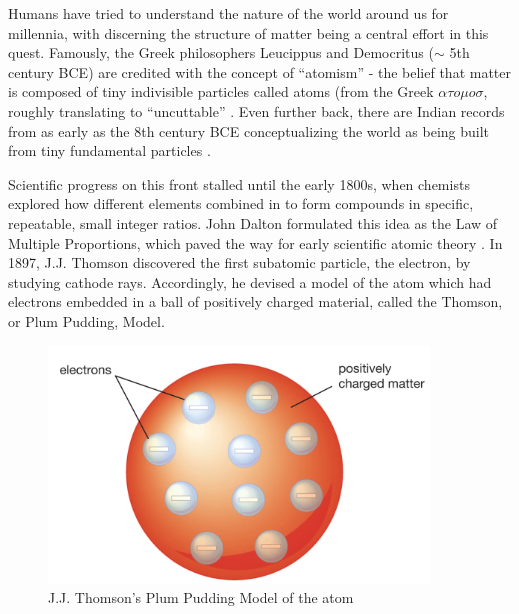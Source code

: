 Humans have tried to understand the nature of the world around us for millennia, with discerning the structure of matter being a central effort in this quest. Famously, the Greek philosophers Leucippus and Democritus ($\sim$ 5th century BCE) are credited with the concept of ``atomism'' - the belief that matter is composed of tiny indivisible particles called atoms (from the Greek $\alpha \tau o \mu o \sigma$, roughly translating to ``uncuttable'' \parencite{C.C.W.Taylor1999Commentary}. Even further back, there are Indian records from as early as the 8th century BCE conceptualizing the world as being built from tiny fundamental particles \parencite{ThomasMcEvilley2002THePhilosophies}.

Scientific progress on this front stalled until the early 1800s, when chemists explored how different elements combined in to form compounds in specific, repeatable, small integer ratios. John Dalton formulated this idea as the Law of Multiple Proportions, which paved the way for early scientific atomic theory \parencite{Britannica2010LawProportions}. In 1897, J.J. Thomson discovered the first subatomic particle, the electron, by studying cathode rays\parencite{Thomson1901OnAtoms}. Accordingly, he devised a model of the atom which had electrons embedded in a ball of positively charged material, called the Thomson, or Plum Pudding, Model\parencite{JaumeNavarro1995AThomson}.

\begin{figure}
    \centering
    \includegraphics[width=0.9\textwidth]{Chapters/Ch1-Intro/Ch1-Sec1-Background/pics/plumbpudding.png}
    \caption[J.J. Thomson's Plum Pudding Model]{J.J. Thomson's Plum Pudding Model of the atom \parencite{Britannica2023ThomsonModel} }
    \label{fig:PlumPudding}
\end{figure}

